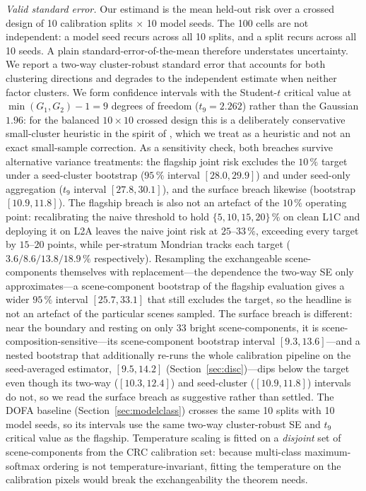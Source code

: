 \documentclass[preprint,3p,times]{elsarticle}
\begin{document}
\emph{Valid standard error.} Our estimand is the mean held-out risk over a crossed design of 10 calibration splits $\times$ 10 model seeds. The 100 cells are not independent: a model seed recurs across all 10 splits, and a split recurs across all 10 seeds. A plain standard-error-of-the-mean therefore understates uncertainty. We report a two-way cluster-robust standard error \citep{cameron2011} that accounts for both clustering directions and degrades to the independent estimate when neither factor clusters. We form confidence intervals with the Student-$t$ critical value at $\min(G_1,G_2)-1 = 9$ degrees of freedom ($t_9 = 2.262$) rather than the Gaussian $1.96$: for the balanced $10 \times 10$ crossed design this is a deliberately conservative small-cluster heuristic in the spirit of \citet{cameron2011}, which we treat as a heuristic and not an exact small-sample correction. As a sensitivity check, both breaches survive alternative variance treatments: the flagship joint risk excludes the $10\,\%$ target under a seed-cluster bootstrap ($95\,\%$ interval $[28.0, 29.9]$) and under seed-only aggregation ($t_9$ interval $[27.8, 30.1]$), and the surface breach likewise (bootstrap $[10.9, 11.8]$). The flagship breach is also not an artefact of the $10\,\%$ operating point: recalibrating the naive threshold to hold $\{5, 10, 15, 20\}\,\%$ on clean L1C and deploying it on L2A leaves the naive joint risk at $25$--$33\,\%$, exceeding every target by $15$--$20$ points, while per-stratum Mondrian tracks each target ($3.6/8.6/13.8/18.9\,\%$ respectively). Resampling the exchangeable scene-components themselves with replacement---the dependence the two-way SE only approximates---a scene-component bootstrap of the flagship evaluation gives a wider $95\,\%$ interval $[25.7, 33.1]$ that still excludes the target, so the headline is not an artefact of the particular scenes sampled. The surface breach is different: near the boundary and resting on only $33$ bright scene-components, it is scene-composition-sensitive---its scene-component bootstrap interval $[9.3, 13.6]$---and a nested bootstrap that additionally re-runs the whole calibration pipeline on the seed-averaged estimator, $[9.5, 14.2]$ (Section~\ref{sec:disc})---dips below the target even though its two-way ($[10.3, 12.4]$) and seed-cluster ($[10.9, 11.8]$) intervals do not, so we read the surface breach as suggestive rather than settled. The DOFA baseline (Section~\ref{sec:modelclass}) crosses the same 10 splits with 10 model seeds, so its intervals use the same two-way cluster-robust SE and $t_9$ critical value as the flagship. Temperature scaling is fitted on a \emph{disjoint} set of scene-components from the CRC calibration set: because multi-class maximum-softmax ordering is not temperature-invariant, fitting the temperature on the calibration pixels would break the exchangeability the theorem needs.
\end{document}
